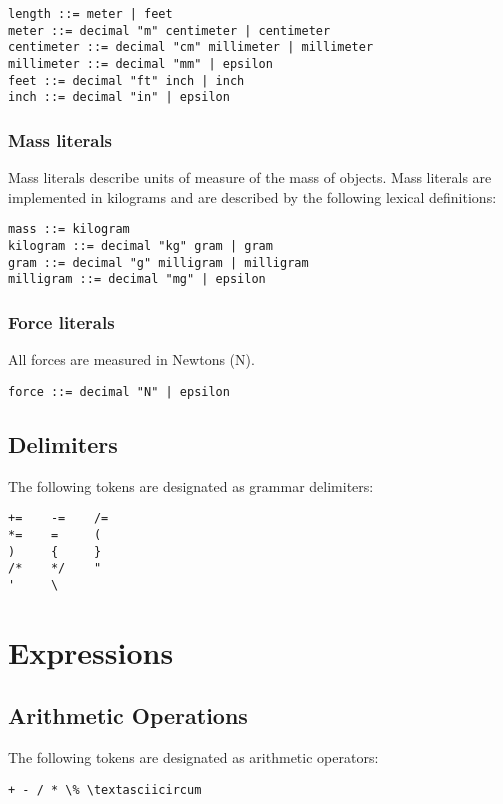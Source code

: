 \documentclass[letterpaper]{article}
\begin{document}
\begin{verbatim}
length ::= meter | feet
meter ::= decimal "m" centimeter | centimeter
centimeter ::= decimal "cm" millimeter | millimeter
millimeter ::= decimal "mm" | epsilon
feet ::= decimal "ft" inch | inch
inch ::= decimal "in" | epsilon
\end{verbatim}

\subsubsection{Mass literals}

Mass literals describe units of measure of the mass of objects. Mass
literals are implemented in kilograms and are described by the
following lexical definitions:

\begin{verbatim}
mass ::= kilogram
kilogram ::= decimal "kg" gram | gram
gram ::= decimal "g" milligram | milligram
milligram ::= decimal "mg" | epsilon
\end{verbatim}

\subsubsection{Force literals}

All forces are measured in Newtons (N).

\begin{verbatim}
force ::= decimal "N" | epsilon
\end{verbatim}

\subsection{Delimiters}
The following tokens are designated as grammar delimiters:

\begin{verbatim}
+=    -=    /=        	
*=    =     (
)     {     }
/*    */    "
'     \
\end{verbatim}

\section{Expressions}

\subsection{Arithmetic Operations}
The following tokens are designated as arithmetic operators:
\begin{verbatim}
+ - / * \% \textasciicircum
\end{verbatim}
\end{document}
